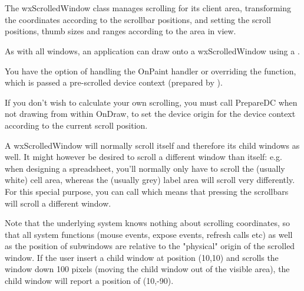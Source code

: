 \section{}\label{wxscrolledwindow}

The wxScrolledWindow class manages scrolling for its client area, transforming
the coordinates according to the scrollbar positions, and setting the
scroll positions, thumb sizes and ranges according to the area in view.

As with all windows, an application can draw onto a wxScrolledWindow using a .

You have the option of handling the OnPaint handler
or overriding the  function, which is passed
a pre-scrolled device context (prepared by ).

If you don't wish to calculate your own scrolling, you must call PrepareDC when not drawing from
within OnDraw, to set the device origin for the device context according to the current
scroll position.

A wxScrolledWindow will normally scroll itself and therefore its child windows as well. It
might however be desired to scroll a different window than itself: e.g. when designing a
spreadsheet, you'll normally only have to scroll the (usually white) cell area, whereas the
(usually grey) label area will scroll very differently. For this special purpose, you can
call  which means that pressing
the scrollbars will scroll a different window.

Note that the underlying system knows nothing about scrolling coordinates, so that all system
functions (mouse events, expose events, refresh calls etc) as well as the position of subwindows
are relative to the "physical" origin of the scrolled window. If the user insert a child window at
position (10,10) and scrolls the window down 100 pixels (moving the child window out of the visible
area), the child window will report a position of (10,-90).



\\
\\
\\


